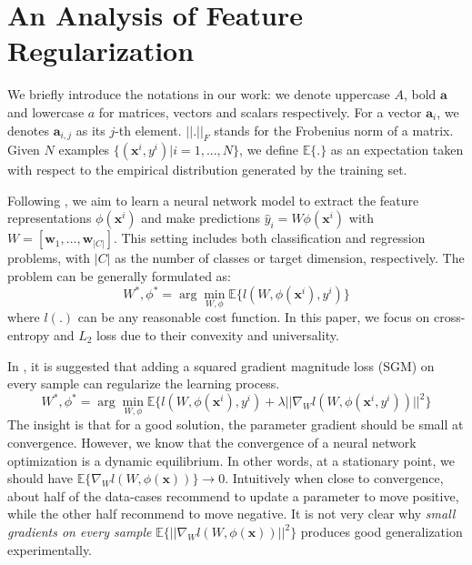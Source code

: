 \section{An Analysis of Feature Regularization}
We briefly introduce the notations in our work: we denote uppercase $A$, bold $\mathbf{a}$ and lowercase $a$ for matrices, vectors and scalars respectively. For a vector $\mathbf{a}_i$, we denotes $\mathbf{a}_{i,j} $ as its $j$-th element.  $||.||_F$ stands for the Frobenius norm of a matrix. Given $N$ examples $\{(\mathbf{x}^i,y^i)|i=1,...,N\}$, we define $\mathbb{E}\{.\}$ as an expectation taken with respect to the empirical distribution generated by the training set.

Following \cite{low-shot}, we aim to learn a neural network model to extract the  feature representations $\phi(\mathbf{x}^i)$ and make predictions $\hat{y}_i=W\phi(\mathbf{x}^i)$ with $W=[\mathbf{w}_1,...,\mathbf{w}_{|C|}]$. This setting includes both classification and regression problems, with $|C|$ as the number of classes or target dimension, respectively. The problem can be generally formulated as:
\begin{equation}
W^*,\phi^*=\arg\min_{W,\phi}\mathbb{E}\{l(W,\phi(\mathbf{x}^i),y^i)\}
\end{equation}
where $l(.)$ can be any reasonable cost function. {\color{red}In this paper, we focus on cross-entropy and  $L_2$ loss due to their convexity and universality.} %

In \cite{low-shot}, it is suggested that adding a squared gradient magnitude loss (SGM) on every sample can regularize the learning process.
\begin{equation}
W^*,\phi^*=\arg\min_{W,\phi}\mathbb{E}\{l(W,\phi(\mathbf{x}^i),y^i)+\lambda||\nabla_Wl(W,\phi(\mathbf{x}^i,y^i))||^2\}
\end{equation}
The insight is that for a good solution, the parameter gradient should be small at convergence. However, we know that the convergence of a neural network optimization is a dynamic equilibrium. In other words, at a stationary point, we should have $\mathbb{E}\{\nabla_W l(W,\phi(\mathbf{x}))\}\rightarrow0$. Intuitively %
when close to convergence, about half of the data-cases recommend to update a parameter to move {\color{red}positive}, while the other half recommend to move {\color{red}negative}. It is not very clear why \textit{small gradients on every sample} $\mathbb{E}\{||\nabla_W l(W,\phi(\mathbf{x}))||^2\}$ produces good generalization experimentally.

